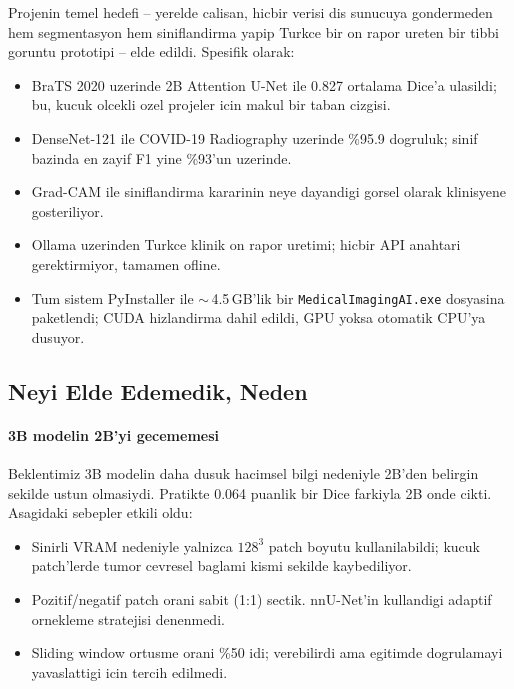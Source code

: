 \documentclass[conference]{IEEEtran}
\begin{document}
Projenin temel hedefi -- yerelde calisan, hicbir verisi dis sunucuya
gondermeden hem segmentasyon hem siniflandirma yapip Turkce bir on rapor
ureten bir tibbi goruntu prototipi -- elde edildi. Spesifik olarak:

\begin{itemize}
  \item BraTS 2020 uzerinde 2B Attention U-Net ile 0.827 ortalama Dice'a
        ulasildi; bu, kucuk olcekli ozel projeler icin makul bir taban cizgisi.
  \item DenseNet-121 ile COVID-19 Radiography uzerinde \%95.9 dogruluk; sinif
        bazinda en zayif F1 yine \%93'un uzerinde.
  \item Grad-CAM ile siniflandirma kararinin neye dayandigi gorsel olarak
        klinisyene gosteriliyor.
  \item Ollama uzerinden Turkce klinik on rapor uretimi; hicbir API anahtari
        gerektirmiyor, tamamen ofline.
  \item Tum sistem PyInstaller ile $\sim$\,4.5\,GB'lik bir
        \texttt{MedicalImagingAI.exe} dosyasina paketlendi; CUDA hizlandirma
        dahil edildi, GPU yoksa otomatik CPU'ya dusuyor.
\end{itemize}

\subsection{Neyi Elde Edemedik, Neden}

\paragraph{3B modelin 2B'yi gecememesi}
Beklentimiz 3B modelin daha dusuk hacimsel bilgi nedeniyle 2B'den belirgin
sekilde ustun olmasiydi. Pratikte 0.064 puanlik bir Dice farkiyla 2B onde
cikti. Asagidaki sebepler etkili oldu:
\begin{itemize}
  \item Sinirli VRAM nedeniyle yalnizca $128^{3}$ patch boyutu kullanilabildi;
        kucuk patch'lerde tumor cevresel baglami kismi sekilde kaybediliyor.
  \item Pozitif/negatif patch orani sabit (1:1) sectik. nnU-Net'in
        \cite{isensee2021nnunet} kullandigi adaptif ornekleme stratejisi
        denenmedi.
  \item Sliding window ortusme orani \%50 idi; %
        verebilirdi ama egitimde dogrulamayi yavaslattigi icin tercih
        edilmedi.
\end{itemize}
\end{document}
